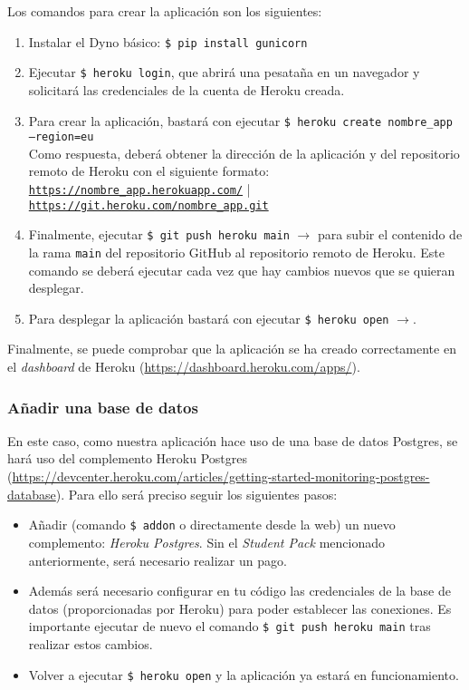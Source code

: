 Los comandos para crear la aplicación son los siguientes:

\begin{enumerate}
    \item Instalar el Dyno básico: \texttt{\$ pip install gunicorn}
    
    \item Ejecutar \texttt{\$ heroku login}, que abrirá una pesataña en un navegador y solicitará las credenciales de la cuenta de Heroku creada.
    
    \item Para crear la aplicación, bastará con ejecutar \texttt{\$ heroku create nombre\_app --region=eu} \\
    Como respuesta, deberá obtener la dirección de la aplicación y del repositorio remoto de Heroku con el siguiente formato: \\
    \texttt{\url{https://nombre\_app.herokuapp.com/}} | \texttt{\url{https://git.heroku.com/nombre\_app.git}}
    
    \item Finalmente, ejecutar \texttt{\$ git push heroku main} $\to$ para subir el contenido de la rama \texttt{main} del repositorio GitHub al repositorio remoto de Heroku. Este comando se deberá ejecutar cada vez que hay cambios nuevos que se quieran desplegar.
    
    \item Para desplegar la aplicación bastará con ejecutar \texttt{\$ heroku open} $\to$.
\end{enumerate}

Finalmente, se puede comprobar que la aplicación se ha creado correctamente en el \textit{dashboard} de Heroku (\url{https://dashboard.heroku.com/apps/}).

\subsubsection{Añadir una base de datos}
En este caso, como nuestra aplicación hace uso de una base de datos Postgres, se hará uso del complemento Heroku Postgres (\url{https://devcenter.heroku.com/articles/getting-started-monitoring-postgres-database}). Para ello será preciso seguir los siguientes pasos:

\begin{itemize}
    \item Añadir (comando \texttt{\$ addon} o directamente desde la web) un nuevo complemento: \textit{Heroku Postgres}. Sin el \textit{Student Pack} mencionado anteriormente, será necesario realizar un pago.
    
    \item Además será necesario configurar en tu código las credenciales de la base de datos (proporcionadas por Heroku) para poder establecer las conexiones. Es importante ejecutar de nuevo el comando \texttt{\$ git push heroku main} tras realizar estos cambios.

    \item Volver a ejecutar \texttt{\$ heroku open} y la aplicación ya estará en funcionamiento.
\end{itemize}

